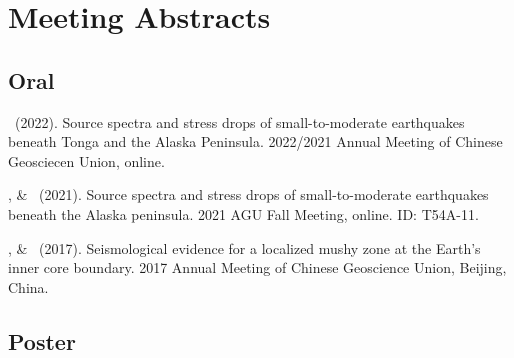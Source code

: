 \section{Meeting Abstracts}

\subsection{Oral}

\begin{etaremune}
\item
	\Me\ (2022).
	Source spectra and stress drops of small-to-moderate earthquakes beneath Tonga and the Alaska Peninsula.
	2022/2021 Annual Meeting of Chinese Geosciecen Union, online.
\item
	\Me, \& \SWei\ (2021).
    Source spectra and stress drops of small-to-moderate earthquakes beneath the Alaska peninsula.
    2021 AGU Fall Meeting, online. ID: T54A-11.
\item
    \Me, \& \LWen\ (2017).
    Seismological evidence for a localized mushy zone at the Earth's inner core boundary.
    2017 Annual Meeting of Chinese Geoscience Union, Beijing, China.
\end{etaremune}

\subsection{Poster}

